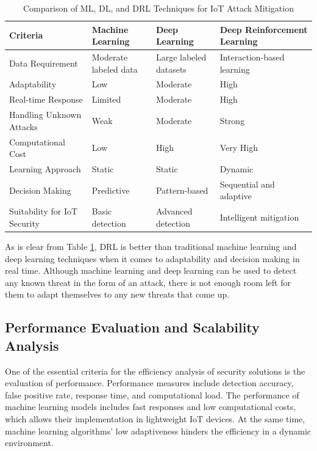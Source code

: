 \documentclass[12pt]{article}
\begin{document}
\begin{table}[h]
\centering
\caption{Comparison of ML, DL, and DRL Techniques for IoT Attack Mitigation}
\label{tab:comparison_methods}
\renewcommand{\arraystretch}{1.5}
\begin{tabular}{|p{2.5cm}|p{3cm}|p{3cm}|p{3cm}|}
\hline
\textbf{Criteria} & \textbf{Machine Learning} & \textbf{Deep Learning} & \textbf{Deep Reinforcement Learning} \\
\hline
Data Requirement & Moderate labeled data & Large labeled datasets & Interaction-based learning \\
\hline
Adaptability & Low & Moderate & High \\
\hline
Real-time Response & Limited & Moderate & High \\
\hline
Handling Unknown Attacks & Weak & Moderate & Strong \\
\hline
Computational Cost & Low & High & Very High \\
\hline
Learning Approach & Static & Static & Dynamic \\
\hline
Decision Making & Predictive & Pattern-based & Sequential and adaptive \\
\hline
Suitability for IoT Security & Basic detection & Advanced detection & Intelligent mitigation \\
\hline
\end{tabular}
\end{table}
As is clear from Table \ref{tab:comparison_methods}, DRL is better than traditional machine learning and deep learning techniques when it comes to adaptability and decision making in real time. Although machine learning and deep learning can be used to detect any known threat in the form of an attack, there is not enough room left for them to adapt themselves to any new threats that come up.
\subsection{Performance Evaluation and Scalability Analysis}
One of the essential criteria for the efficiency analysis of security solutions is the evaluation of performance. Performance measures include detection accuracy, false positive rate, response time, and computational load. The performance of machine learning models includes fast responses and low computational costs, which allows their implementation in lightweight IoT devices. At the same time, machine learning algorithms' low adaptiveness hinders the efficiency in a dynamic environment.
\end{document}
